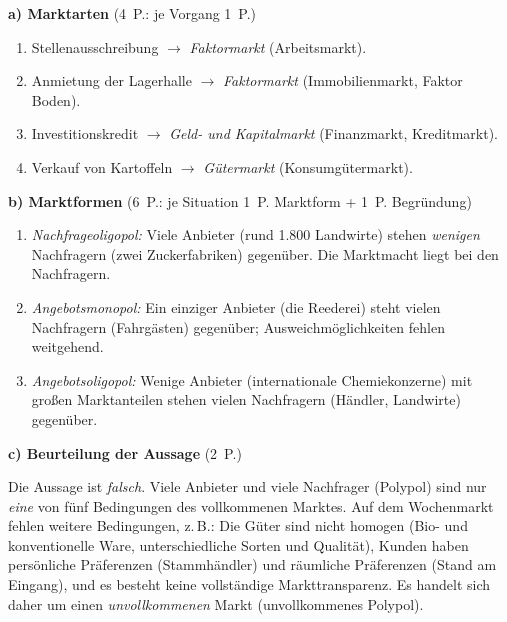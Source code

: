 \begin{loesung}[title={Lösung Aufgabe~1.2 --- Marktarten und Marktformen}]
\textbf{a) Marktarten} \hfill (4~P.: je Vorgang 1~P.)
\begin{enumerate}[label=(\arabic*)]
  \item Stellenausschreibung $\rightarrow$ \emph{Faktormarkt} (Arbeitsmarkt).
  \item Anmietung der Lagerhalle $\rightarrow$ \emph{Faktormarkt} (Immobilienmarkt,
    Faktor Boden).
  \item Investitionskredit $\rightarrow$ \emph{Geld- und Kapitalmarkt} (Finanzmarkt,
    Kreditmarkt).
  \item Verkauf von Kartoffeln $\rightarrow$ \emph{Gütermarkt} (Konsumgütermarkt).
\end{enumerate}

\textbf{b) Marktformen} \hfill (6~P.: je Situation 1~P. Marktform + 1~P. Begründung)
\begin{enumerate}[label=(\arabic*)]
  \item \emph{Nachfrageoligopol:} Viele Anbieter (rund 1.800 Landwirte) stehen
    \emph{wenigen} Nachfragern (zwei Zuckerfabriken) gegenüber. Die Marktmacht liegt bei
    den Nachfragern.
  \item \emph{Angebotsmonopol:} Ein einziger Anbieter (die Reederei) steht vielen
    Nachfragern (Fahrgästen) gegenüber; Ausweichmöglichkeiten fehlen weitgehend.
  \item \emph{Angebotsoligopol:} Wenige Anbieter (internationale Chemiekonzerne) mit
    großen Marktanteilen stehen vielen Nachfragern (Händler, Landwirte) gegenüber.
\end{enumerate}

\textbf{c) Beurteilung der Aussage} \hfill (2~P.)

Die Aussage ist \emph{falsch}. Viele Anbieter und viele Nachfrager (Polypol) sind nur
\emph{eine} von fünf Bedingungen des vollkommenen Marktes. Auf dem Wochenmarkt fehlen
weitere Bedingungen, z.\,B.: Die Güter sind nicht homogen (Bio- und konventionelle Ware,
unterschiedliche Sorten und Qualität), Kunden haben persönliche Präferenzen
(Stammhändler) und räumliche Präferenzen (Stand am Eingang), und es besteht keine
vollständige Markttransparenz. Es handelt sich daher um einen \emph{unvollkommenen} Markt
(unvollkommenes Polypol).
\end{loesung}

